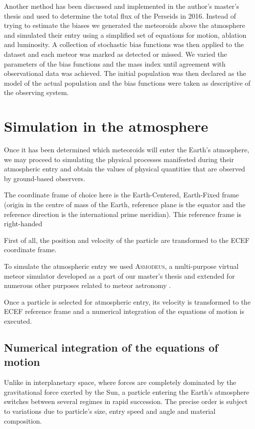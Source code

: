     Another method has been discussed and implemented in the author's master's thesis \citep{balaz-thesis}
    and used to determine the total flux of the Perseids in 2016. Instead of trying to
    estimate the biases we generated the meteoroids above the atmosphere and simulated
    their entry using a simplified set of equations for motion, ablation and luminosity.
    A collection of stochastic bias functions was then applied to the dataset and
    each meteor was marked as detected or missed. We varied the parameters of the bias functions
    and the mass index until agreement with observational data was achieved.
    The initial population was then declared as the model of the actual population
    and the bias functions were taken as descriptive of the observing system.


\section{Simulation in the atmosphere} \label{ma}
    Once it has been determined which meteoroids will enter the Earth's atmosphere, we may proceed to simulating
    the physical processes manifested during their atmospheric entry and obtain the values of physical quantities
    that are observed by ground-based observers.

    The coordinate frame of choice here is the Earth-Centered, Earth-Fixed frame (origin in the centre of mass of the Earth,
    reference plane is the equator and the reference direction is the international prime meridian).
    This reference frame is right-handed

    First of all, the position and velocity of the particle are transformed to the ECEF coordinate frame.

    To simulate the atmospheric entry we used \textsc{Asmodeus},
    a multi-purpose virtual meteor simulator developed as a part of our master's thesis and extended for numerous
    other purposes related to meteor astronomy \citep{balaz-thesis,balaz+2020}.

    Once a particle is selected for atmospheric entry, its velocity is transformed to the ECEF reference frame
    and a numerical integration of the equations of motion is executed.

    \subsection{Numerical integration of the equations of motion} \label{sai}
        Unlike in interplanetary space, where forces are completely dominated by the gravitational force exerted by the Sun,
        a particle entering the Earth's atmosphere switches between several regimes in rapid succession.
        The precise order is subject to variations due to particle's size, entry speed and angle
        and material composition.



